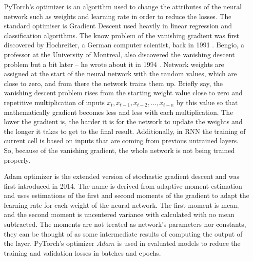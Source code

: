 PyTorch's optimizer is an algorithm used to change the attributes of the neural network such as weights and learning rate in order to reduce the losses. The standard optimiser is Gradient Descent used heavily in linear regression and classification algorithms. The know problem of the vanishing gradient was first discovered by Hochreiter, a German computer scientist, back in 1991 \cite{lstm_orig}. Bengio, a professor at the University of Montreal, also discovered the vanishing descent problem but a bit later – he wrote about it in 1994 \cite{rnn_difficults}. Network weights are assigned at the start of the neural network with the random values, which are close to zero, and from there the network trains them up. Briefly say, the vanishing descent problem rises from the starting weight value close to zero and repetitive multiplication of inputs $x_t, x_{t-1}, x_{t-2},...,x_{t-n}$ by this value so that mathematically gradient becomes less and less with each multiplication. The lower the gradient is, the harder it is for the network to update the weights and the longer it takes to get to the final result. Additionally, in RNN the training of current cell is based on inputs that are coming from previous untrained layers. So, because of the vanishing gradient, the whole network is not being trained properly.

Adam optimizer is the extended version of stochastic gradient descent and was first introduced in 2014. The name is derived from adaptive moment estimation and uses estimations of the first and second moments of the gradient to adapt the learning rate for each weight of the neural network. The first moment is mean, and the second moment is uncentered variance with calculated with no mean subtracted. The moments are not treated as network's parameters nor constants, they can be thought of as some intermediate results of computing the output of the layer. PyTorch's optimizer $Adam$  is used in evaluated models to reduce the training and validation losses in batches and epochs.

